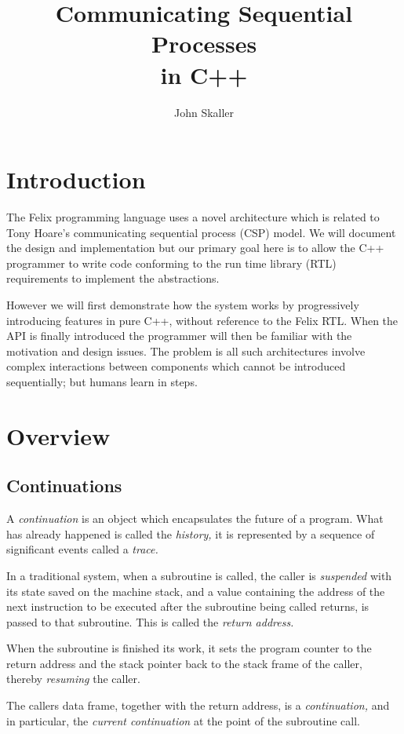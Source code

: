 \documentclass[oneside]{book}
\title{Communicating Sequential Processes\\ in C++}
\author{John Skaller}
\begin{document}
\maketitle
\tableofcontents
\chapter{Introduction}
The Felix programming language uses a novel architecture which is related to
Tony Hoare's communicating sequential process (CSP) model. We will document
the design and implementation but our primary goal here is to allow the
C++ programmer to write code conforming to the run time library (RTL) requirements
to implement the abstractions.

However we will first demonstrate how the system works by progressively
introducing features in pure C++, without reference to the Felix RTL.
When the API is finally introduced the programmer will then be familiar
with the motivation and design issues. The problem is all such architectures
involve complex interactions between components which cannot be introduced
sequentially; but humans learn in steps.

\chapter{Overview}

\section{Continuations}
A {\em continuation} is an object which encapsulates the future of a program.
What has already happened is called the {\em history,} it is represented by a sequence
of significant events called a {\em trace.}

In a traditional system, when a subroutine is called, the caller is {\em suspended}
with its state saved on the machine stack, and a value containing the address
of the next instruction to be executed after the subroutine being called
returns, is passed to that subroutine. This is called the {\em return address.}

When the subroutine is finished its work, it sets the program counter
to the return address and the stack pointer back to the stack frame of the
caller, thereby {\em resuming} the caller.

The callers data frame, together with the return address, is a {\em continuation,}
and in particular, the {\em current continuation} at the point of the subroutine 
call. 
\end{document}

